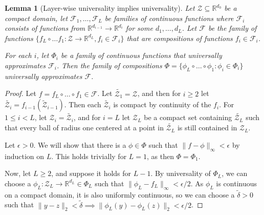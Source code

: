 \documentclass{article} \usepackage{iclr2023_conference,times}
\newcommand{\RR}{\mathbb R}
\newcommand{\mc}[1]{\mathcal{#1}}
\newcommand\norm[1]{\lVert#1\rVert}
\newtheorem{lemma}{Lemma}
\begin{document}
\begin{lemma}[Layer-wise universality implies universality]\label{lem:layer_universal}
    Let $\mc Z \subseteq \RR^{d_0}$ be a compact domain, let $\mc F_1, \ldots, \mc F_L$ be families of continuous functions where $\mc F_i$ consists of functions from $\RR^{d_{i-1}} \to \RR^{d_i}$ for some $d_1, \ldots, d_L$. Let $\mc F$ be the family of functions $\{f_L \circ \ldots f_1: \mc Z \to \RR^{d_L}, f_i \in \mc F_i\}$ that are compositions of functions $f_i \in \mc F_i$.

    For each $i$, let $\Phi_i$ be a family of continuous functions that universally approximates $\mc F_i$. Then the family of compositions $\Phi = \{\phi_L \circ \ldots \circ \phi_1 : \phi_i \in \Phi_i  \}$ universally approximates $\mc F$.
\end{lemma}
\begin{proof}
    Let $f = f_L \circ \ldots \circ f_1 \in \mc F$. Let $\tilde{\mc Z_1} = \mc Z$, and then for $i \geq 2$ let $\tilde{\mc Z_i} = f_{i-1}(\tilde{\mc Z}_{i-1})$. Then each $\tilde{\mc Z_i}$ is compact by continuity of the $f_i$. For $1 \leq  i < L$, let $\mc Z_i = \tilde{\mc Z_i}$, and for $i = L$ let $\mc Z_L$ be a compact set containing $\tilde{\mc Z_L}$ such that every ball of radius one centered at a point in $\tilde{\mc Z_L}$ is still contained in $\mc Z_L$.

Let $\epsilon > 0$. We will show that there is a $\phi \in \Phi$ such that $\norm{f - \phi}_\infty < \epsilon$ by induction on $L$. This holds trivially for $L=1$, as then $\Phi = \Phi_1$.

Now, let $L \geq 2$, and suppose it holds for $L-1$. By universality of $\Phi_L$, we can choose a $\phi_L: \mc Z_L \to \RR^{d_L} \in \Phi_L$ such that $\norm{\phi_L - f_L}_\infty < \epsilon/2$. As $\phi_L$ is continuous on a compact domain, it is also uniformly continuous, so we can choose a $\tilde{\delta} > 0$ such that $\norm{y-z}_2 < \tilde{\delta} \implies \norm{\phi_L(y) - \phi_L(z)}_2 < \epsilon / 2$.


\end{proof}
\end{document}

